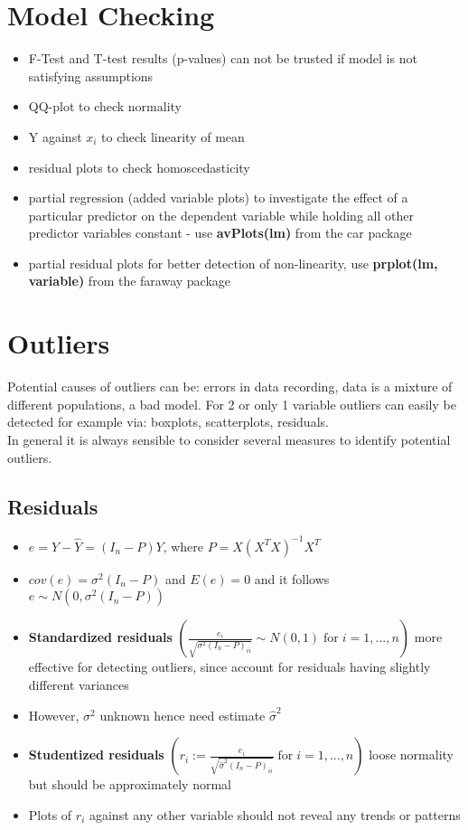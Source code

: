 \documentclass{article}
\begin{document}
\section{Model Checking}
\begin{itemize}
    \item F-Test and T-test results (p-values) can not be trusted if model is not satisfying assumptions
    \item QQ-plot to check normality
    \item Y against $x_i$ to check linearity of mean
    \item residual plots to check homoscedasticity
    \item partial regression (added variable plots) to investigate the effect of a particular predictor on the dependent variable while holding all other predictor variables constant - use \textbf{avPlots(lm)} from the car package
    \item partial residual plots for better detection of non-linearity, use \textbf{prplot(lm, variable)} from the faraway package
\end{itemize}

\section{Outliers}

Potential causes of outliers can be: errors in data recording, data is a mixture of different populations, a bad model.
For 2 or only 1 variable outliers can easily be detected for example via: boxplots, scatterplots, residuals.\\

In general it is always sensible to consider several measures to identify potential outliers.

\subsection{Residuals}
\begin{itemize}
    \item $e = Y-\hat{Y} = (I_n - P)Y$, where $P=X(X^TX)^{-1}X^T$
    \item $cov(e) = \sigma^2(I_n-P)$ and $E(e)=0$ and it follows $e\sim N(0,\sigma^2(I_n-P))$
    \item \textbf{Standardized residuals} $\left( \frac{e_i}{\sqrt{\sigma^2(I_n-P)_{ii}}}\sim N(0,1)\; \text{for}\; i=1,...,n \right)$ more effective for detecting outliers, since account for residuals having slightly different variances
    \item However, $\sigma^2$ unknown hence need estimate $\hat{\sigma}^2$
    \item \textbf{Studentized residuals} $\left( r_i := \frac{e_i}{\sqrt{\hat{\sigma}^2(I_n-P)_{ii}}}\; \text{for}\; i=1,...,n \right)$ loose normality but should be approximately normal
    \item Plots of $r_i$ against any other variable should not reveal any trends or patterns
\end{itemize}
\end{document}
